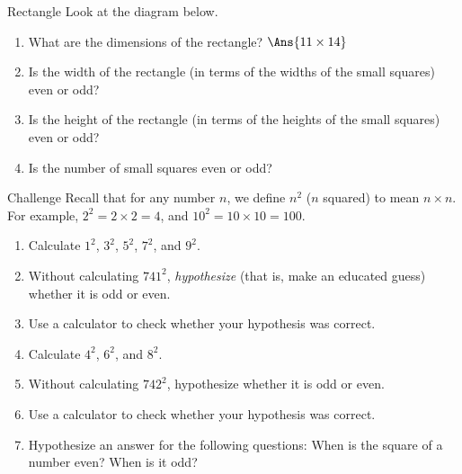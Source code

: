 \documentclass[12pt,letterpaper]{article}
\begin{document}
\begin{problem}{Rectangle}
 Look at the diagram below.

 \begin{center}
 \end{center}

 \begin{enumerate}
  \item What are the dimensions of the rectangle? \hfill
  $\Ans{11\times14}$
  \item Is the width of the rectangle (in terms of the widths of the small
  squares) even or odd? 
  \item Is the height of the rectangle (in terms of the heights of the small
  squares) even or odd? 
  \item Is the number of small squares even or odd? 
 \end{enumerate}
\end{problem}

\begin{problem}{Challenge}
 Recall that for any number $n$, we define $n^2$ ($n$ squared) to mean
 $n\times n$. For example, $2^2=2\times2=4$, and $10^2=10\times10=100$.

 \begin{enumerate}
  \item Calculate $1^2$, $3^2$, $5^2$, $7^2$, and $9^2$.
  \item Without calculating $741^2$, \emph{hypothesize} (that is, make an
  educated guess) whether it is odd or even.
  \item Use a calculator to check whether your hypothesis was correct.
  \item Calculate $4^2$, $6^2$, and $8^2$. 
  \item Without calculating $742^2$, hypothesize whether it is odd or even.
  \item Use a calculator to check whether your hypothesis was correct.
  \item Hypothesize an answer for the following questions:
  When is the square of a number even? When is it odd?
 \end{enumerate}
\end{problem}
\end{document}
